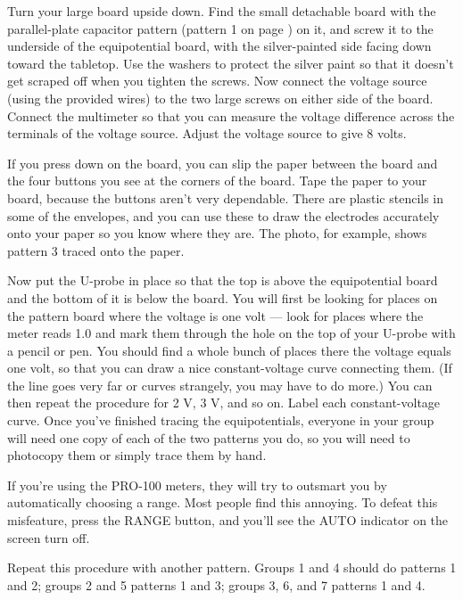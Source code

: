 Turn your large board upside down. Find the small detachable board
with the parallel-plate capacitor pattern (pattern 1 on page \pageref{em-fie-patterns}) on it, and screw
it to the underside of the equipotential board, with the
silver-painted side facing down toward the tabletop. Use the washers to
protect the silver paint so that it doesn't get scraped off when you tighten
the screws. Now connect the voltage source
(using the provided wires) to the two large screws on either
side of the board. Connect the multimeter so that you can measure
the voltage difference across the terminals of the voltage
source. Adjust the voltage source to give 8 volts.

\label{em-fie-patterns}

If you press down on the board, you can slip the paper
between the board and the four buttons you see at the
corners of the board. Tape the paper to your board, because the buttons aren't
very dependable. There are plastic stencils in some of the envelopes,
and you can use these to draw the electrodes accurately onto your paper
so you know where they are. The photo, for example, shows pattern 3
traced onto the paper.

Now put the U-probe in place so that
the top is above the equipotential board and the bottom of
it is below the board. You will first be looking for places
on the pattern board where the voltage is one volt --- look
for places where the meter reads 1.0 and mark them through
the hole on the top of your U-probe with a pencil or pen.
You should find a whole bunch of places there the voltage
equals one volt, so that you can draw a nice constant-voltage
curve connecting them. (If the line goes very far or curves
strangely, you may have to do more.) You can then repeat the
procedure for 2 V, 3 V, and so on.  Label each
constant-voltage curve.  Once you've finished tracing the equipotentials,
everyone in your group will need one copy of each of the two
patterns you do, so you will need to photocopy them or
simply trace them by hand.

If you're using the PRO-100 meters, they will try to outsmart you by automatically
choosing a range. Most people find this annoying. To defeat this misfeature,
press the RANGE button, and you'll see the AUTO indicator on the screen turn off.

Repeat this procedure with another pattern. Groups 1 and 4 should do patterns
1 and 2; groups 2 and 5 patterns 1 and 3; groups 3, 6, and 7 patterns 1 and 4.

